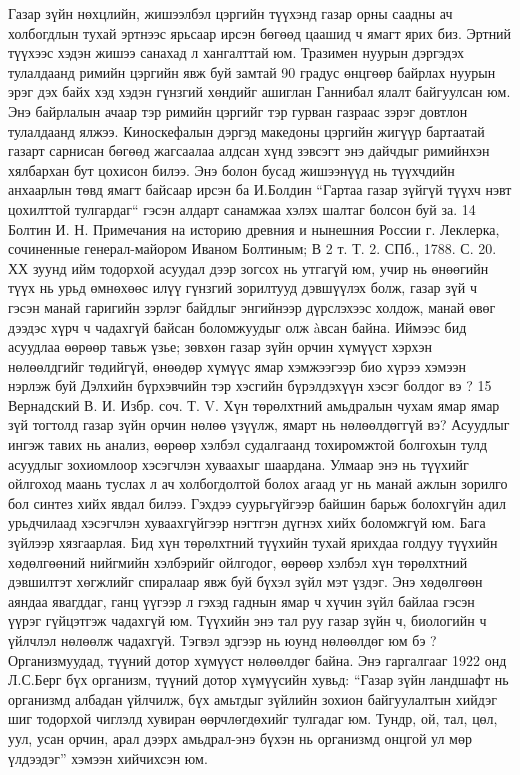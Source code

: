 Газар зүйн нөхцлийн, жишээлбэл цэргийн түүхэнд газар орны саадны ач холбогдлын тухай эртнээс ярьсаар ирсэн бөгөөд цаашид ч ямагт ярих биз. Эртний түүхээс хэдэн жишээ санахад л хангалттай юм. Тразимен нуурын дэргэдэх тулалдаанд римийн цэргийн явж буй замтай 90 градус өнцгөөр байрлах нуурын эрэг дэх байх хэд хэдэн гүнзгий хөндийг ашиглан Ганнибал ялалт байгуулсан юм. Энэ байрлалын ачаар тэр римийн цэргийг тэр гурван газраас зэрэг довтлон тулалдаанд ялжээ. Киноскефалын дэргэд македоны цэргийн жигүүр бартаатай газарт сарнисан бөгөөд жагсаалаа алдсан хүнд зэвсэгт энэ дайчдыг римийнхэн хялбархан бут цохисон билээ. Энэ болон бусад жишээнүүд нь түүхчдийн анхаарлын төвд ямагт байсаар ирсэн ба И.Болдин “Гартаа газар зүйгүй түүхч нэвт цохилттой тулгардаг“ гэсэн алдарт санамжаа хэлэх шалтаг болсон буй за.
14 Болтин И. Н. Примечания на историю древния и нынешния России г. Леклерка, сочиненные генерал-майором Иваном Болтиным; В 2 т. Т. 2. СПб., 1788. С. 20.
ХХ зуунд ийм тодорхой асуудал дээр зогсох нь утгагүй юм, учир нь өнөөгийн түүх нь урьд өмнөхөөс илүү гүнзгий зорилтууд дэвшүүлэх болж, газар зүй ч гэсэн манай гаригийн зэрлэг байдлыг энгийнээр дүрслэхээс холдож, манай өвөг дээдэс хүрч ч чадахгүй байсан боломжуудыг олж àвсан байна.
Иймээс бид асуудлаа өөрөөр тавьж үзье; зөвхөн газар зүйн орчин хүмүүст хэрхэн нөлөөлдгийг төдийгүй, өнөөдөр хүмүүс ямар хэмжээгээр био хүрээ хэмээн нэрлэж буй Дэлхийн бүрхэвчийн тэр хэсгийн бүрэлдэхүүн хэсэг болдог вэ ?
15 Вернадский В. И. Избр. соч. Т. V.
Хүн төрөлхтний амьдралын чухам ямар ямар зүй тогтолд газар зүйн орчин нөлөө үзүүлж, ямарт нь нөлөөлдөггүй вэ? Асуудлыг ингэж тавих нь анализ, өөрөөр хэлбэл судалгаанд тохиромжтой болгохын тулд асуудлыг зохиомлоор хэсэгчлэн хуваахыг шаардана. Улмаар энэ нь түүхийг ойлгоход маань туслах л ач холбогдолтой болох агаад уг нь манай ажлын зорилго бол синтез хийх явдал билээ. Гэхдээ суурьгүйгээр байшин барьж болохгүйн адил урьдчилаад хэсэгчлэн хуваахгүйгээр нэгтгэн дүгнэх хийх боломжгүй юм. Бага зүйлээр хязгаарлая. Бид хүн төрөлхтний түүхийн тухай ярихдаа голдуу түүхийн хөдөлгөөний нийгмийн хэлбэрийг ойлгодог, өөрөөр хэлбэл хүн төрөлхтний дэвшилтэт хөгжлийг спиралаар явж буй бүхэл зүйл мэт үздэг. Энэ хөдөлгөөн аяндаа явагддаг, ганц үүгээр л гэхэд гаднын ямар ч хүчин зүйл байлаа гэсэн үүрэг гүйцэтгэж чадахгүй юм.
Түүхийн энэ тал руу газар зүйн ч, биологийн ч үйлчлэл нөлөөлж чадахгүй. Тэгвэл эдгээр нь юунд нөлөөлдөг юм бэ ? Организмуудад, түүний дотор хүмүүст нөлөөлдөг байна. Энэ гаргалгааг 1922 онд Л.С.Берг бүх организм, түүний дотор хүмүүсийн хувьд: “Газар зүйн ландшафт нь организмд албадан үйлчилж, бүх амьтдыг зүйлийн зохион байгуулалтын хийдэг шиг тодорхой чиглэлд хувиран өөрчлөгдөхийг тулгадаг юм. Тундр, ой, тал, цөл, уул, усан орчин, арал дээрх амьдрал-энэ бүхэн нь организмд онцгой ул мөр үлдээдэг” хэмээн хийчихсэн юм.
